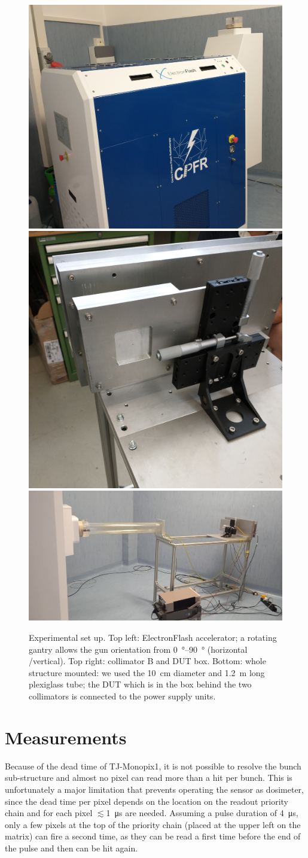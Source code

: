       \begin{figure}[h!]
         \centering
         \includegraphics[width=.40\linewidth]{figures/test_beam/electron_flash.jpg}
         \includegraphics[width=.35\linewidth]{figures/test_beam/collimator_box.jpg}\\     
         \includegraphics[width=.77\linewidth]{figures/test_beam/carrello.jpeg} 
         \label{fig:set_up}
         \caption{Experimental set up. Top left: ElectronFlash accelerator; a
         rotating gantry allows the gun orientation from \SIrange{0}{90}{\degree} (horizontal /vertical). Top right: collimator B and DUT box. Bottom: whole structure mounted: we used the \SI{10}{cm} diameter and \SI{1.2}{m} long plexiglass tube; the DUT which is in the box behind the two collimators is connected to the power supply units.}
      \end{figure}  



\section{Measurements}\label{sec:Santa_chiara_measurement}
   Because of the dead time of TJ-Monopix1, it is not possible to resolve the bunch sub-structure and almost no pixel can read more than a hit per bunch. This is unfortunately a major limitation that prevents operating the sensor as dosimeter, since the dead time per pixel depends on the location on the readout priority chain and for each pixel $\lesssim$\SI{1}{\us} are needed. Assuming a pulse duration of \SI{4}{\us}, only a few pixels at the top of the priority chain (placed at the upper left on the matrix) can fire a second time, as they can be read a first time before the end of the pulse and then can be hit again.

